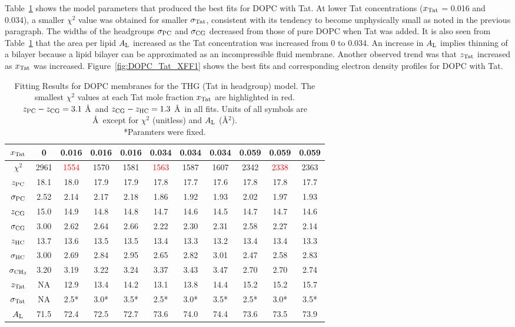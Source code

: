 Table~\ref{tab:DOPC_fit_results} shows the model parameters that produced
the best fits for DOPC with Tat.
At lower Tat concentrations ($x_\textrm{Tat}$ = 0.016 and 0.034), 
a smaller $\chi^2$ value was obtained for smaller $\sigma_\textrm{Tat}$,
consistent with its tendency to become unphysically small as noted 
in the previous paragraph. The widths of the headgroups $\sigma_\textrm{PC}$ and
$\sigma_\textrm{CG}$ decreased from those of pure DOPC when Tat was added.  
It is also seen from Table~\ref{tab:DOPC_fit_results} 
that the area per lipid $A_\textrm{L}$ increased as the Tat concentration was
increased from 0 to 0.034. An increase in $A_\textrm{L}$ implies thinning of a bilayer because
a lipid bilayer can be approximated as an incompressible fluid membrane. 
Another observed trend was that $z_\textrm{Tat}$ increased as $x_\textrm{Tat}$ was increased.
Figure~\ref{fig:DOPC_Tat_XFF1} shows the best fits and corresponding 
electron density profiles for DOPC with Tat.

\begin{table}[htbp]
  \centering
  \begin{tabular}{c|c|ccc|ccc|ccc}
    \hline
    $x_\textrm{Tat}$ & 0 & 0.016 & 0.016 & 0.016 & 0.034 & 0.034 & 0.034 & 0.059 & 0.059 & 0.059 \\
    \hline
    $\chi^2$ & 2961 & \textcolor{red}{1554} & 1570 & 1581 & \textcolor{red}{1563} & 1587 & 1607 & 2342 & \textcolor{red}{2338} & 2363 \\ 
    $z_\textrm{PC}$ & 18.1 & 18.0 & 17.9 & 17.9 & 17.8 & 17.7 & 17.6 & 17.8 & 17.8 & 17.7 \\
    $\sigma_\textrm{PC}$ & 2.52 & 2.14 & 2.17 & 2.18 & 1.86 & 1.92 & 1.93 & 2.02 & 1.97 & 1.93 \\
    $z_\textrm{CG}$ & 15.0 & 14.9 & 14.8 & 14.8 & 14.7 & 14.6 & 14.5 & 14.7 & 14.7 & 14.6 \\
    $\sigma_\textrm{CG}$ & 3.00 & 2.62 & 2.64 & 2.66 & 2.22 & 2.30 & 2.31 & 2.58 & 2.27 & 2.14 \\
    $z_\textrm{HC}$ & 13.7 & 13.6 & 13.5 & 13.5 & 13.4 & 13.3 & 13.2 & 13.4 & 13.4 & 13.3 \\ 
    $\sigma_\textrm{HC}$ & 3.00 & 2.69 & 2.84 & 2.95 & 2.65 & 2.82 & 3.01 & 2.47 & 2.58 & 2.83 \\
    $\sigma_{\textrm{CH}_3}$ & 3.20 & 3.19 & 3.22 & 3.24 & 3.37 & 3.43 & 3.47 & 2.70 & 2.70 & 2.74 \\
    $z_\textrm{Tat}$ & NA & 12.9 & 13.4 & 14.2 & 13.1 & 13.8 & 14.4 & 15.2 & 15.2 & 15.7 \\
    $\sigma_\textrm{Tat}$ & NA & 2.5* & 3.0* & 3.5* & 2.5* & 3.0* & 3.5* & 2.5* & 3.0* & 3.5* \\ 
    $A_\textrm{L}$ & 71.5 & 72.4 & 72.5 & 72.7 & 73.6 & 74.0 & 74.4 & 73.6 & 73.5 & 73.9 \\
    \hline
  \end{tabular}
  \caption[Fitting Results for DOPC membranes for the THG (Tat in headgroup) model]
  {Fitting Results for DOPC membranes for the THG (Tat in headgroup) model. 
  The smallest $\chi^2$ values at each Tat mole fraction $x_\textrm{Tat}$ are highlighted in red.  
  $z_\textrm{PC}-z_\textrm{CG} = 3.1$ \AA\
  and $z_\textrm{CG}-z_\textrm{HC} = 1.3$ \AA\ in all fits.
  Units of all symbols are \AA\ except for $\chi^2$ (unitless) and $A_\textrm{L}$ (\AA$^2$).  
  \\
  *Paramters were fixed.}
  \label{tab:DOPC_fit_results}
\end{table}

